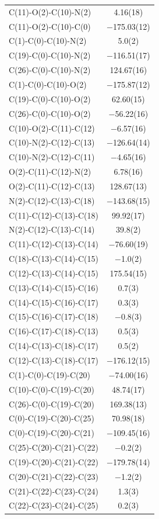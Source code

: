 \begin{center}
{\begin{supertabular}{p{1.5in}c}
C(11)-O(2)-C(10)-N(2)&4.16(18)\\
C(11)-O(2)-C(10)-C(0)&$-$175.03(12)\\
C(1)-C(0)-C(10)-N(2)&5.0(2)\\
C(19)-C(0)-C(10)-N(2)&$-$116.51(17)\\
C(26)-C(0)-C(10)-N(2)&124.67(16)\\
C(1)-C(0)-C(10)-O(2)&$-$175.87(12)\\
C(19)-C(0)-C(10)-O(2)&62.60(15)\\
C(26)-C(0)-C(10)-O(2)&$-$56.22(16)\\
C(10)-O(2)-C(11)-C(12)&$-$6.57(16)\\
C(10)-N(2)-C(12)-C(13)&$-$126.64(14)\\
C(10)-N(2)-C(12)-C(11)&$-$4.65(16)\\
O(2)-C(11)-C(12)-N(2)&6.78(16)\\
O(2)-C(11)-C(12)-C(13)&128.67(13)\\
N(2)-C(12)-C(13)-C(18)&$-$143.68(15)\\
C(11)-C(12)-C(13)-C(18)&99.92(17)\\
N(2)-C(12)-C(13)-C(14)&39.8(2)\\
C(11)-C(12)-C(13)-C(14)&$-$76.60(19)\\
C(18)-C(13)-C(14)-C(15)&$-$1.0(2)\\
C(12)-C(13)-C(14)-C(15)&175.54(15)\\
C(13)-C(14)-C(15)-C(16)&0.7(3)\\
C(14)-C(15)-C(16)-C(17)&0.3(3)\\
C(15)-C(16)-C(17)-C(18)&$-$0.8(3)\\
C(16)-C(17)-C(18)-C(13)&0.5(3)\\
C(14)-C(13)-C(18)-C(17)&0.5(2)\\
C(12)-C(13)-C(18)-C(17)&$-$176.12(15)\\
C(1)-C(0)-C(19)-C(20)&$-$74.00(16)\\
C(10)-C(0)-C(19)-C(20)&48.74(17)\\
C(26)-C(0)-C(19)-C(20)&169.38(13)\\
C(0)-C(19)-C(20)-C(25)&70.98(18)\\
C(0)-C(19)-C(20)-C(21)&$-$109.45(16)\\
C(25)-C(20)-C(21)-C(22)&$-$0.2(2)\\
C(19)-C(20)-C(21)-C(22)&$-$179.78(14)\\
C(20)-C(21)-C(22)-C(23)&$-$1.2(2)\\
C(21)-C(22)-C(23)-C(24)&1.3(3)\\
C(22)-C(23)-C(24)-C(25)&0.2(3)\\

\end{supertabular}}
\end{center}
